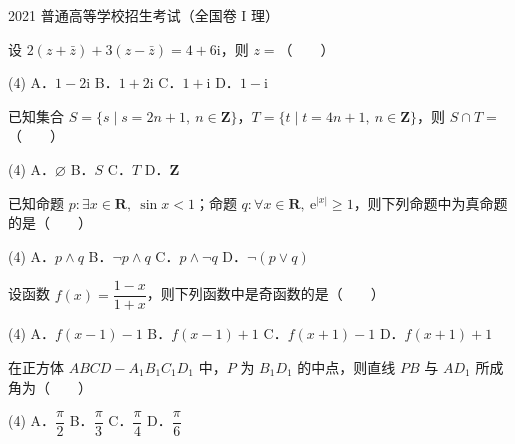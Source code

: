 

\begin{gktip}
2021 普通高等学校招生考试（全国卷 I 理）
\end{gktip}

\par\medskip


\begin{question}
设 $2(z+\bar z)+3(z-\bar z)=4+6\mathrm i$，则 $z=$\mbox{（　　）}

\begin{gkopts}(4)
\task A．$1-2\mathrm i$
\task B．$1+2\mathrm i$
\task C．$1+\mathrm i$
\task D．$1-\mathrm i$
\end{gkopts}

\end{question}
\begin{question}
已知集合 $S=\{s\mid s=2n+1,\ n\in\mathbf Z\}$，$T=\{t\mid t=4n+1,\ n\in\mathbf Z\}$，则 $S\cap T=$\mbox{（　　）}

\begin{gkopts}(4)
\task A．$\varnothing$
\task B．$S$
\task C．$T$
\task D．$\mathbf Z$
\end{gkopts}

\end{question}
\begin{question}
已知命题 $p:\exists x\in\mathbf R,\ \sin x<1$；命题 $q:\forall x\in\mathbf R,\ \mathrm e^{|x|}\geqslant1$，则下列命题中为真命题的是\mbox{（　　）}

\begin{gkopts}(4)
\task A．$p\land q$
\task B．$\neg p\land q$
\task C．$p\land\neg q$
\task D．$\neg(p\lor q)$
\end{gkopts}

\end{question}
\begin{question}
设函数 $f(x)=\dfrac{1-x}{1+x}$，则下列函数中是奇函数的是\mbox{（　　）}

\begin{gkopts}(4)
\task A．$f(x-1)-1$
\task B．$f(x-1)+1$
\task C．$f(x+1)-1$
\task D．$f(x+1)+1$
\end{gkopts}

\end{question}
\begin{question}
在正方体 $ABCD-A_1B_1C_1D_1$ 中，$P$ 为 $B_1D_1$ 的中点，则直线 $PB$ 与 $AD_1$ 所成角为\mbox{（　　）}

\begin{gkopts}(4)
\task A．$\dfrac{\pi}{2}$
\task B．$\dfrac{\pi}{3}$
\task C．$\dfrac{\pi}{4}$
\task D．$\dfrac{\pi}{6}$
\end{gkopts}

\end{question}
